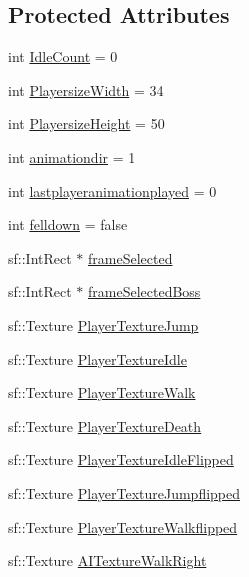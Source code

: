 \subsection*{Protected Attributes}
\begin{DoxyCompactItemize}
\item 
int \hyperlink{classAnimation_ac717012475788ebb501d44c5acc8f09e}{Idle\+Count} = 0
\item 
int \hyperlink{classAnimation_a5fa2dfbbf58158d08b03b3f6fe677d6c}{Playersize\+Width} = 34
\item 
int \hyperlink{classAnimation_a8aff77b932ad98856335149cbd9b0eb9}{Playersize\+Height} = 50
\item 
int \hyperlink{classAnimation_a1e2bb6d1c9f98f54006d4e38a60b0843}{animationdir} = 1
\item 
int \hyperlink{classAnimation_a5d14d0bf77c2f5eb34f84a51c32ab465}{lastplayeranimationplayed} = 0
\item 
int \hyperlink{classAnimation_a280c2cafd8a95afa1dcfd1f7a78e0427}{felldown} = false
\item 
sf\+::\+Int\+Rect $\ast$ \hyperlink{classAnimation_ad46a2f93624e4c2ed6df5852d1e43306}{frame\+Selected}
\item 
sf\+::\+Int\+Rect $\ast$ \hyperlink{classAnimation_a642ba989c928d568640537c2c4233047}{frame\+Selected\+Boss}
\item 
sf\+::\+Texture \hyperlink{classAnimation_ae4b3ea24c42829931659562795a5f2a1}{Player\+Texture\+Jump}
\item 
sf\+::\+Texture \hyperlink{classAnimation_a180eeacc0353a8809fafccbbb27bac87}{Player\+Texture\+Idle}
\item 
sf\+::\+Texture \hyperlink{classAnimation_a8c0f17a9bd55c23ab3dcf4af5cb83d8a}{Player\+Texture\+Walk}
\item 
sf\+::\+Texture \hyperlink{classAnimation_ae2c4250f642ea945b2370857712d120b}{Player\+Texture\+Death}
\item 
sf\+::\+Texture \hyperlink{classAnimation_ae0d16eacff8f27f0308a63718c34a832}{Player\+Texture\+Idle\+Flipped}
\item 
sf\+::\+Texture \hyperlink{classAnimation_adecc1934d4a148f0cfa36e01c2b2de62}{Player\+Texture\+Jumpflipped}
\item 
sf\+::\+Texture \hyperlink{classAnimation_a3e5bd7e9fd80edc832581382f6f38ebf}{Player\+Texture\+Walkflipped}
\item 
sf\+::\+Texture \hyperlink{classAnimation_a30495fb9193f8f7cefc524200d35c44e}{A\+I\+Texture\+Walk\+Right}
\item 

\end{DoxyCompactItemize}
